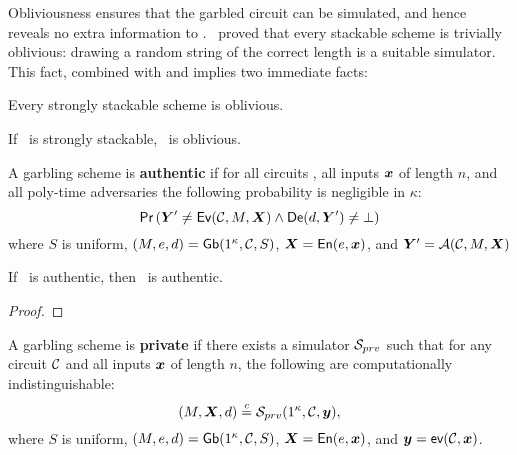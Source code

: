 Obliviousness ensures that the garbled circuit can be simulated, and
hence reveals no extra information to \E.
\HK\ proved that every stackable scheme is trivially oblivious:
drawing a random string of the correct length is a suitable simulator.
This fact, combined with  and
 implies two
immediate facts:
\begin{lemma}\label{lemma:obliviousness}
  Every strongly stackable scheme is oblivious.
\end{lemma}
\begin{theorem}\label{thm:oblivious}
  If \underscheme\ is strongly stackable, \ourscheme\ is oblivious.
\end{theorem}

\begin{definition}[Authenticity]\label{def:authenticity}
  A garbling scheme is \textbf{authentic} if for
  all circuits \cir,
  all inputs $\cirinp$ of length $n$,
  and all poly-time adversaries \adv 
  the following probability is negligible in $\kappa$:
  \[
    \pr{\gcirout' \neq \gEv(\cir, \mat,\gcirinp)
    \land
    \gDe(d, \gcirout') \neq \bot}
  \]
  where
  $S$ is uniform,
  $(M, e, d) = \textsf{Gb}(1^\kappa,\mathcal C,S)$,
  $\gcirinp = \gEn(e,\cirinp)$,
  and $\gcirout' = \adv(\cir, \mat, \gcirinp)$
\end{definition}

\begin{theorem}\label{thm:authenticity}
  If \underscheme\ is authentic, then \ourscheme\ is authentic.
\end{theorem}
\begin{proof}
\end{proof}

\begin{definition}[Privacy]\label{def:privacy}
  A garbling scheme is \textbf{private} if
  there exists a simulator $\mathcal{S}_{prv}$ such that for
  any circuit $\mathcal C$
  and all inputs $\cirinp$ of length $n$,
  the following are computationally indistinguishable:
   \[
  (\mat, \gcirinp, d)
  \indist
  \simulator_{prv}(1^\kappa, \cir, \cirout),
  \]
  where
  $S$ is uniform,
   $(M, e, d) = \textsf{Gb}(1^\kappa,\mathcal C,S)$,
  $\gcirinp = \gEn(e,\cirinp)$,
  and $\cirout = \gev(\cir,\cirinp)$. 
\end{definition}

